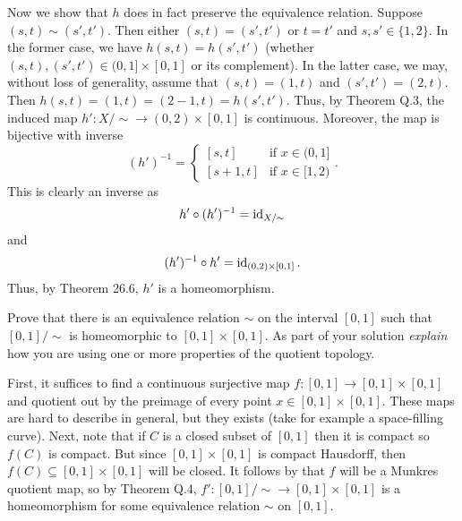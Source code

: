 \begin{solution}
  Now we show that \(h\) does in fact preserve the equivalence
  relation. Suppose \((s,t)\sim(s',t')\). Then either \((s,t)=(s',t')\) or
  \(t=t'\) and \(s,s'\in\{1,2\}\). In the former case, we have
  \(h(s,t)=h(s',t')\) (whether \((s,t),(s',t')\in(0,1]\times[0,1]\) or its
  complement). In the latter case, we may, without loss of generality,
  assume that \((s,t)=(1,t)\) and \((s',t')=(2,t)\). Then
  \(h(s,t)=(1,t)=(2-1,t)=h(s',t')\). Thus, by Theorem Q.3, the induced map
  \(h'\colon X/{\sim}\to(0,2)\times[0,1]\) is continuous. Moreover, the map
  is bijective with inverse
  \[
    (h')^{-1}=
    \begin{cases}
      [s,t]&\text{if \(x\in (0,1]\)}\\
      [s+1,t]&\text{if \(x\in [1,2)\)}
    \end{cases}.
  \]
  This is clearly an inverse as
  \[
    h'\circ (h')^{-1}=\operatorname{id}_{X/{\sim}}
  \]
  and
  \[
    (h')^{-1}\circ h'=\operatorname{id}_{(0,2)\times[0,1]}.
  \]
  Thus, by Theorem 26.6, \(h'\) is a homeomorphism.
\end{solution}

\begin{problem}
  Prove that there is an equivalence relation \(\sim\) on the interval
  \([0,1]\) such that \([0,1]/{\sim}\) is homeomorphic to
  \([0,1]\times[0,1]\). As part of your solution \emph{explain} how you are
  using one or more properties of the quotient topology.
\end{problem}
\begin{solution}
  First, it suffices to find a continuous surjective map
  \(f\colon[0,1]\to [0,1]\times[0,1]\) and quotient out by the preimage of
  every point \(x\in[0,1]\times[0,1]\). These maps are hard to describe in
  general, but they exists (take for example a space-filling curve). Next,
  note that if \(C\) is a closed subset of \([0,1]\) then it is compact so
  \(f(C)\) is compact. But since \([0,1]\times[0,1]\) is compact Hausdorff,
  then \(f(C)\subseteq[0,1]\times[0,1]\) will be closed. It follows by that
  \(f\) will be a Munkres quotient map, so by Theorem Q.4,
  \(f'\colon [0,1]/{\sim}\to[0,1]\times[0,1]\) is a homeomorphism for some
  equivalence relation \(\sim\) on \([0,1]\).
\end{solution}

